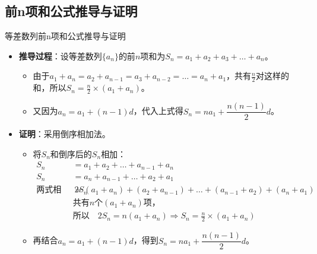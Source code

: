 \documentclass[aspectratio=169]{ctexbeamer} %
\begin{document}
\subsection{前n项和公式推导与证明}
\begin{frame}{等差数列前n项和公式推导与证明}
\begin{itemize}
\item \textbf{推导过程}：设等差数列$\{a_n\}$的前$n$项和为$S_n = a_1 + a_2 + a_3 + \dots + a_n$。
\begin{itemize}
\item 由于$a_1 + a_n = a_2 + a_{n-1} = a_3 + a_{n-2} = \dots = a_n + a_1$，共有$\frac{n}{2}$对这样的和，所以$S_n = \frac{n}{2} \times (a_1 + a_n)$。
\item 又因为$a_n = a_1 + (n - 1)d$，代入上式得$S_n = na_1 + \dfrac{n(n-1)}{2}d$。
\end{itemize}
\item \textbf{证明}：采用倒序相加法。
\begin{itemize}
\item 将$S_n$和倒序后的$S_n$相加：
\begin{align*}
S_n &= a_1 + a_2 + \dots + a_{n-1} + a_n \\
S_n &= a_n + a_{n-1} + \dots + a_2 + a_1 \\
\text{两式相加得}\quad 2 S_n &= (a_1 + a_n) + (a_2 + a_{n-1}) + \dots + (a_{n-1} + a_2) + (a_n + a_1) \\
&\text{共有$n$个$(a_1 + a_n)$项，} \\
&\text{所以}\quad 2 S_n = n (a_1 + a_n) \Rightarrow S_n = \frac{n}{2} \times (a_1 + a_n)
\end{align*}
\item 再结合$a_n = a_1 + (n - 1)d$，得到$S_n = na_1 + \dfrac{n(n-1)}{2} d$。
\end{itemize}
\end{itemize}
\end{frame}
\end{document}
